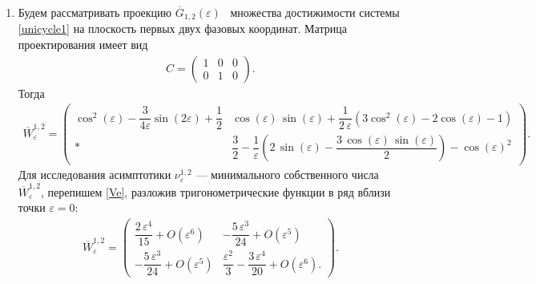 \documentclass[../main.tex]{subfiles}
\begin{document}
 \begin{enumerate}
 \item Будем рассматривать проекцию $ \overline{G}_{1,2}(\varepsilon) $  множества  достижимости системы \eqref{unicycle1} на плоскость первых двух фазовых координат. 
Матрица проектирования имеет вид
 \begin{gather*}
 C = \begin{pmatrix}
 1 & 0 & 0 \\ 
 0 & 1 & 0 
 \end{pmatrix}. 
 \end{gather*} 
 Тогда\small
 \begin{gather}\label{Ve}
 \overline{W}_{\varepsilon}^{1,2}= \begin{pmatrix}
 \cos^2(\varepsilon)-\dfrac{3}{4\varepsilon}\sin(2\varepsilon)+\dfrac{1}{2} & 
 \cos\left(\varepsilon \right)\,\sin\left(\varepsilon \right)+\dfrac{1}{2\,\varepsilon}\left( 3\cos^2\left(\varepsilon \right)-2\cos\left(\varepsilon\right)-1\right) \\[6pt]
 * &
 \dfrac{3}{2}-\dfrac{1}{\varepsilon }\left(2\,\sin\left(\varepsilon \right)-\dfrac{3\,\cos\left(\varepsilon \right)\,\sin\left(\varepsilon \right)}{2} \right) -{\cos\left(\varepsilon \right)}^2 
 \end{pmatrix}.
 \end{gather}
 \normalsize
 Для исследования асимптотики $ \nu^{1,2}_{\varepsilon} $ --- минимального собственного числа $ \overline{W}_{\varepsilon}^{1,2} $, перепишем \eqref{Ve}, разложив тригонометрические функции в ряд вблизи точки $ \varepsilon = 0 $:
 \begin{gather*}
 \overline{W}_{\varepsilon}^{1,2} = \begin{pmatrix}
 \dfrac{2\,\varepsilon ^4}{15} + O(\varepsilon^6)&
 -\dfrac{5\,\varepsilon ^3}{24} + O(\varepsilon^5)\\[8pt]
 -\dfrac{5\,\varepsilon ^3}{24} + O(\varepsilon^5) & 
 \dfrac{\varepsilon ^2}{3}-\dfrac{3\,\varepsilon ^4}{20} + O(\varepsilon^6).
 \end{pmatrix}.
 \end{gather*}
 

\end{enumerate}
\end{document}
